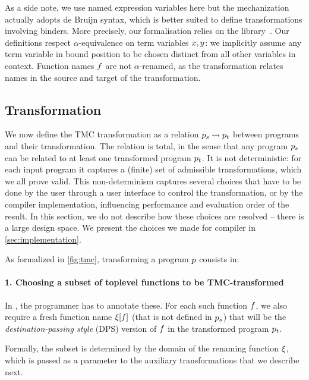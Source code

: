 As a side note, we use named expression variables here but the \Coq mechanization actually adopts de Bruijn syntax, which is better suited to define transformations involving binders.
More precisely, our formalisation relies on the \Autosubst library~\cite{autosubst-2015}.
Our definitions respect $\alpha$-equivalence on term variables $\datalangVar, \datalangVarTwo$: we implicitly assume any term variable in bound position to be chosen distinct from all other variables in context.
Function names $\datalangFn$ are not $\alpha$-renamed, as the transformation relates names in the source and target of the transformation.

\subsection{Transformation}
\label{subsec:transformation}

We now define the TMC transformation as a relation $\datalangProg_s \tmc \datalangProg_t$ between programs and their transformation.
The relation is total, in the sense that any \DataLang program $\datalangProg_s$ can be related to at least one transformed program $\datalangProg_t$.
It is not deterministic: for each input program it captures a (finite) set of admissible transformations, which we all prove valid.
This non-determinism captures several choices that have to be done by the user through a user interface to control the transformation, or by the compiler implementation, influencing performance and evaluation order of the result.
In this section, we do not describe how these choices are resolved -- there is a large design space.
We present the choices we made for \OCaml compiler in \cref{sec:implementation}.

As formalized in \cref{fig:tmc}, transforming a \DataLang program $\datalangProg$ consists in:


\paragraph{1. Choosing a subset of toplevel functions to be TMC-transformed}
In \OCaml, the programmer has to annotate these.
For each such function $\datalangFn$, we also require a fresh function name $\datalangRenaming [\datalangFn]$ (that is not defined in $\datalangProg_s$) that will be the \emph{destination-passing style} (DPS) version of $\datalangFn$ in the transformed program $\datalangProg_t$.

Formally, the subset is determined by the domain of the renaming function $\xi$, which is passed as a parameter to the auxiliary transformations that we describe next.

